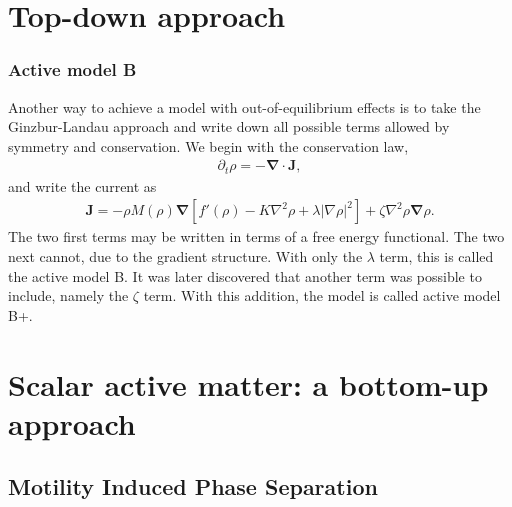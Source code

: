 \section{Top-down approach}

\subsubsection{Active model B}

Another way to achieve a model with out-of-equilibrium effects is to take the Ginzbur-Landau approach and write down all possible terms allowed by symmetry and conservation.
We begin with the conservation law,
%
\begin{align}
    \partial_t \rho = - \bm \nabla \cdot \bm J,
\end{align}
%
and write the current as
%
\begin{align}
    \bm J = 
    - \rho M(\rho) \bm \nabla 
    \left[
        f'(\rho) - K \nabla^2 \rho + \lambda |\nabla \rho|^2
    \right]
    + \zeta \nabla^2 \rho \bm \nabla \rho.
\end{align}
%
The two first terms may be written in terms of a free energy functional.
The two next cannot, due to the gradient structure.
With only the $\lambda$ term, this is called the active model B.
It was later discovered that another term was possible to include, namely the $\zeta$ term.
With this addition, the model is called active model B+.







\section{Scalar active matter: a bottom-up approach}



\subsection{Motility Induced Phase Separation}


